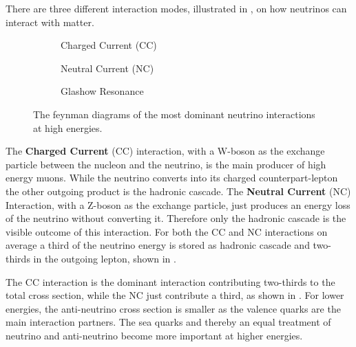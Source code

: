 There are three different interaction modes, illustrated in , on how neutrinos can interact with matter.
\begin{figure}
    \begin{subfigure}{0.31\textwidth}
        \centering
        
        \caption{Charged Current (CC)}
        \label{fig:feyn_nu_cc}
    \end{subfigure}
    \hfill
    \begin{subfigure}{0.31\textwidth}
        \centering
        
        \caption{Neutral Current (NC)}
        \label{fig:feyn_nu_nc}
    \end{subfigure}
    \hfill
    \begin{subfigure}{0.31\textwidth}
        \centering
        
        \caption{Glashow Resonance}
        \label{fig:feyn_glashow}
    \end{subfigure}
    \caption{The feynman diagrams of the most dominant neutrino interactions at high energies.}
    \label{fig:feyn_nu}
\end{figure}

The \textbf{Charged Current} (CC) interaction, with a W-boson as the exchange particle between the nucleon and the neutrino, is the main producer of high energy muons.
While the neutrino converts into its charged counterpart-lepton the other outgoing product is the hadronic cascade.
The \textbf{Neutral Current} (NC) Interaction, with a Z-boson as the exchange particle, just produces an energy loss of the neutrino without converting it.
Therefore only the hadronic cascade is the visible outcome of this interaction.
For both the CC and NC interactions on average a third of the neutrino energy is stored as hadronic cascade and two-thirds in the outgoing lepton, shown in .

The CC interaction is the dominant interaction contributing two-thirds to the total cross section, while the NC just contribute a third, as shown in .
For lower energies, the anti-neutrino cross section is smaller as the valence quarks are the main interaction partners.
The sea quarks and thereby an equal treatment of neutrino and anti-neutrino become more important at higher energies.

